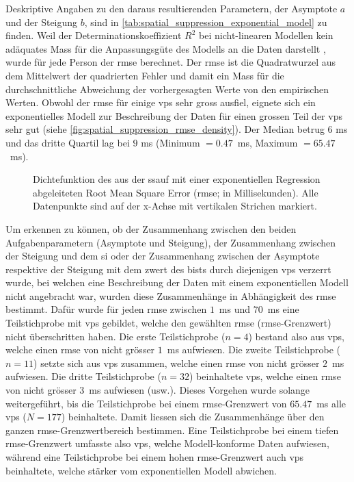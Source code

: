 \documentclass[11pt, twoside, a4paper]{book}		%
\begin{document}
Deskriptive Angaben zu den daraus resultierenden Parametern, der Asymptote $a$ und der Steigung $b$, sind in \autoref{tab:spatial_suppression_exponential_model} zu finden.
Weil der Determinationskoeffizient $R^2$ bei nicht-linearen Modellen kein adäquates Mass für die Anpassungsgüte des Modells an die Daten darstellt \citep{Spiess2010}, wurde für jede Person der \gls{rmse} berechnet. Der \gls{rmse} ist die Quadratwurzel aus dem Mittelwert der quadrierten Fehler und damit ein Mass für die durchschnittliche Abweichung der vorhergesagten Werte von den empirischen Werten. 
Obwohl der \gls{rmse} für einige \glspl{vp} sehr gross ausfiel, eignete sich ein exponentielles Modell zur Beschreibung der Daten für einen grossen Teil der \glspl{vp} sehr gut (siehe \autoref{fig:spatial_suppression_rmse_density}). Der Median betrug $6$ ms und das dritte Quartil lag bei $9$ ms (Minimum $=0.47$~ms, Maximum $=65.47$~ms).

\begin{figure}[t]
	\centering
	\begin{adjustbox}{width=1\textwidth}
		
	\end{adjustbox}
	\caption[Dichtefunktion des aus der \gls{ssauf} mit einer exponentiellen Regression abgeleiteten \gls{rmse}]{Dichtefunktion des aus der \gls{ssauf} mit einer exponentiellen Regression abgeleiteten Root Mean Square Error (\gls{rmse}; in Millisekunden).  Alle Datenpunkte sind auf der x-Achse mit vertikalen Strichen markiert.}
	\label{fig:spatial_suppression_rmse_density}
\end{figure}

Um erkennen zu können, ob der Zusammenhang zwischen den beiden Aufgabenparametern (Asymptote und Steigung), der Zusammenhang zwischen der Steigung und dem \gls{si} oder der Zusammenhang zwischen der Asymptote respektive der Steigung mit dem \gls{zwert} des \gls{bist}s durch diejenigen \glspl{vp} verzerrt wurde, bei welchen eine Beschreibung der Daten mit einem exponentiellen Modell nicht angebracht war, wurden diese Zusammenhänge in Abhängigkeit des \gls{rmse} bestimmt. 
Dafür wurde für jeden \gls{rmse} zwischen $1$~ms und $70$~ms eine Teilstichprobe mit \glspl{vp} gebildet, welche den gewählten \gls{rmse} (\gls{rmse}-Grenzwert) nicht überschritten haben. Die erste Teilstichprobe ($n=4$) bestand also aus \glspl{vp}, welche einen \gls{rmse} von nicht grösser $1$~ms aufwiesen. Die zweite Teilstichprobe ($n=11$) setzte sich aus \glspl{vp} zusammen, welche einen \gls{rmse} von nicht grösser $2$~ms aufwiesen. Die dritte Teilstichprobe ($n=32$) beinhaltete \glspl{vp}, welche einen \gls{rmse} von nicht grösser $3$~ms aufwiesen (usw.). Dieses Vorgehen wurde solange weitergeführt, bis die Teilstichprobe bei einem \gls{rmse}-Grenzwert von $65.47$~ms alle \glspl{vp} ($N=177$) beinhaltete. 
Damit liessen sich die Zusammenhänge über den ganzen \gls{rmse}-Grenz\-wert\-be\-reich bestimmen. Eine Teilstichprobe bei einem tiefen \gls{rmse}-Grenz\-wert umfasste also \glspl{vp}, welche Modell-konforme Daten aufwiesen, während eine Teilstichprobe bei einem hohen \gls{rmse}-Grenzwert auch \glspl{vp} beinhaltete, welche stärker vom exponentiellen Modell abwichen. 
\end{document}
